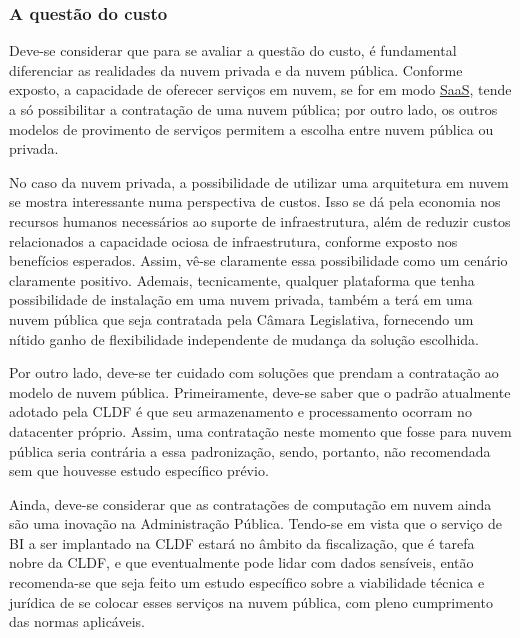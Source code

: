     
    \subsubsection*{A questão do custo}
    
    Deve-se considerar que para se avaliar a questão do custo, é fundamental diferenciar as realidades da nuvem privada e da nuvem pública. Conforme exposto, a capacidade de oferecer serviços em nuvem, se for em modo \hyperref[saas]{SaaS}, tende a só possibilitar a contratação de uma nuvem pública; por outro lado, os outros modelos de provimento de serviços permitem a escolha entre nuvem pública ou privada.
    
    No caso da nuvem privada, a possibilidade de utilizar uma arquitetura em nuvem se mostra interessante numa perspectiva de custos. Isso se dá pela economia nos recursos humanos necessários ao suporte de infraestrutura, além de reduzir custos relacionados a capacidade ociosa de infraestrutura, conforme exposto nos benefícios esperados. Assim, vê-se claramente essa possibilidade como um cenário claramente positivo. Ademais, tecnicamente, qualquer plataforma que tenha possibilidade de instalação em uma nuvem privada, também a terá em uma nuvem pública que seja contratada pela Câmara Legislativa, fornecendo um nítido ganho de flexibilidade independente de mudança da solução escolhida.
    
    Por outro lado, deve-se ter cuidado com soluções que prendam a contratação ao modelo de nuvem pública. Primeiramente, deve-se saber que o padrão atualmente adotado pela CLDF é que seu armazenamento e processamento ocorram no datacenter próprio. Assim, uma contratação neste momento que fosse para nuvem pública seria contrária a essa padronização, sendo, portanto, não recomendada sem que houvesse estudo específico prévio.
    
    Ainda, deve-se considerar que as contratações de computação em nuvem ainda são uma inovação na Administração Pública. Tendo-se em vista que o serviço de BI a ser implantado na CLDF estará no âmbito da fiscalização, que é tarefa nobre da CLDF, e que eventualmente pode lidar com dados sensíveis, então recomenda-se que seja feito um estudo específico sobre a viabilidade técnica e jurídica de se colocar esses serviços na nuvem pública, com pleno cumprimento das normas aplicáveis.
    
